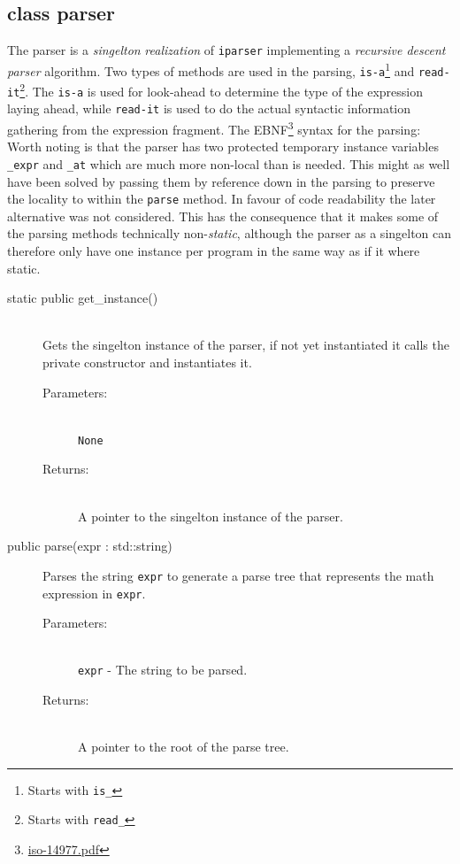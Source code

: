 \documentclass[a4paper,11pt]{kth-mag}
\begin{document}
\subsection{class parser}
The parser is a \emph{singelton} \emph{realization} of \texttt{iparser}
implementing a \emph{recursive descent parser} algorithm. Two
types of methods are used in the parsing, \texttt{is-a}\footnote{Starts with
\texttt{is\_}} and \texttt{read-it}\footnote{Starts with \texttt{read\_}}.
The \texttt{is-a} is used for look-ahead to determine the type of the expression
laying ahead, while \texttt{read-it} is used to do the actual syntactic 
information gathering from the expression fragment.
The EBNF\footnote{\href{www.cl.cam.ac.uk/~mgk25/iso-14977.pdf}{iso-14977.pdf}}
syntax for the parsing:\\


Worth noting is that the parser has two protected temporary instance variables
\texttt{\_expr}
and
\texttt{\_at} 
which are much more non-local than is needed. This might as well have 
been solved by passing them by reference down in the
parsing to preserve the locality to within the \texttt{parse} method. In favour
of code readability the later alternative was not considered.
This has the consequence that it makes some of the parsing 
methods technically non-\emph{static}, although the parser as a singelton can
therefore only have one instance per program in the same way as if it where static.

\begin{description}
    \item[static public get\_instance()]~\\
    Gets the singelton instance of the parser, if not yet instantiated it calls
    the private constructor and instantiates it.
    \begin{description}
        \item[Parameters:]~\\
            \verb+None+
        \item[Returns:]~\\
            A pointer to the singelton instance of the parser.
    \end{description}
\end{description}

\begin{description}
    \item[public parse(expr : std::string)] Parses the string \texttt{expr} to
    generate a parse tree that represents the math expression in \texttt{expr}.
    \begin{description}
        \item[Parameters:]~\\
            \verb+expr+ - The string to be parsed.
        \item[Returns:]~\\
            A pointer to the root of the parse tree.
    \end{description}
\end{description}
\end{document}
